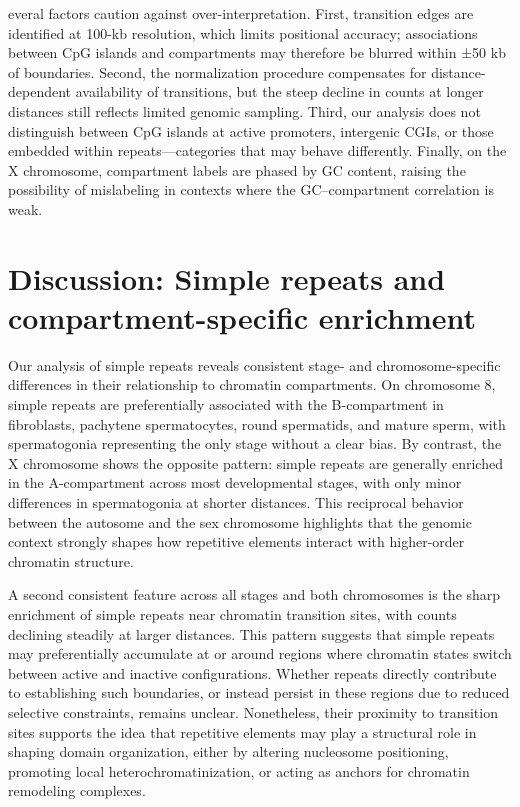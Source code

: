 \documentclass[
  a4paper,
  openany]{scrbook}
\begin{document}
everal factors caution against over-interpretation. First, transition
edges are identified at 100-kb resolution, which limits positional
accuracy; associations between CpG islands and compartments may
therefore be blurred within ±50 kb of boundaries. Second, the
normalization procedure compensates for distance-dependent availability
of transitions, but the steep decline in counts at longer distances
still reflects limited genomic sampling. Third, our analysis does not
distinguish between CpG islands at active promoters, intergenic CGIs, or
those embedded within repeats---categories that may behave differently.
Finally, on the X chromosome, compartment labels are phased by GC
content, raising the possibility of mislabeling in contexts where the
GC--compartment correlation is weak.

\section{Discussion: Simple repeats and compartment-specific
enrichment}\label{discussion-simple-repeats-and-compartment-specific-enrichment}

Our analysis of simple repeats reveals consistent stage- and
chromosome-specific differences in their relationship to chromatin
compartments. On chromosome 8, simple repeats are preferentially
associated with the B-compartment in fibroblasts, pachytene
spermatocytes, round spermatids, and mature sperm, with spermatogonia
representing the only stage without a clear bias. By contrast, the X
chromosome shows the opposite pattern: simple repeats are generally
enriched in the A-compartment across most developmental stages, with
only minor differences in spermatogonia at shorter distances. This
reciprocal behavior between the autosome and the sex chromosome
highlights that the genomic context strongly shapes how repetitive
elements interact with higher-order chromatin structure.

A second consistent feature across all stages and both chromosomes is
the sharp enrichment of simple repeats near chromatin transition sites,
with counts declining steadily at larger distances. This pattern
suggests that simple repeats may preferentially accumulate at or around
regions where chromatin states switch between active and inactive
configurations. Whether repeats directly contribute to establishing such
boundaries, or instead persist in these regions due to reduced selective
constraints, remains unclear. Nonetheless, their proximity to transition
sites supports the idea that repetitive elements may play a structural
role in shaping domain organization, either by altering nucleosome
positioning, promoting local heterochromatinization, or acting as
anchors for chromatin remodeling complexes.
\end{document}
